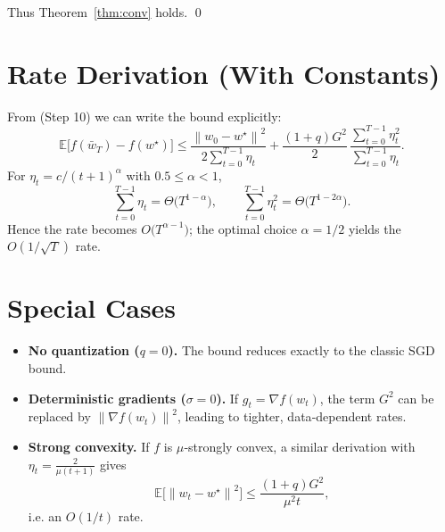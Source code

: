 \documentclass{article}
\newcommand{\E}{\mathbb{E}}
\newcommand{\norm}[1]{\left\| #1 \right\|}
\begin{document}
Thus Theorem~\ref{thm:conv} holds. \qed

\section*{Rate Derivation (With Constants)}
From (Step 10) we can write the bound explicitly:
\[
\E\!\bigl[f(\bar w_T)-f(w^\star)\bigr]
\le \frac{\norm{w_0-w^\star}^2}{2\sum_{t=0}^{T-1}\eta_t}
    +\frac{(1+q)G^{2}}{2}\,\frac{\sum_{t=0}^{T-1}\eta_t^{2}}{\sum_{t=0}^{T-1}\eta_t}.
\]
For $\eta_t=c/(t+1)^{\alpha}$ with $0.5\le\alpha<1$,
\[
\sum_{t=0}^{T-1}\eta_t = \Theta\bigl(T^{1-\alpha}\bigr),\qquad
\sum_{t=0}^{T-1}\eta_t^{2}= \Theta\bigl(T^{1-2\alpha}\bigr).
\]
Hence the rate becomes $O\!\bigl(T^{\alpha-1}\bigr)$; the optimal choice $\alpha=1/2$ yields the $O(1/\sqrt{T})$ rate.

\section*{Special Cases}
\begin{itemize}
\item \textbf{No quantization ($q=0$).} The bound reduces exactly to the classic SGD bound.
\item \textbf{Deterministic gradients ($\sigma=0$).} If $g_t=\nabla f(w_t)$, the term $G^{2}$ can be replaced by $\norm{\nabla f(w_t)}^{2}$, leading to tighter, data‑dependent rates.
\item \textbf{Strong convexity.} If $f$ is $\mu$‑strongly convex, a similar derivation with $\eta_t=\frac{2}{\mu (t+1)}$ gives
\[
\E\!\bigl[\norm{w_t-w^\star}^{2}\bigr]\le \frac{(1+q)G^{2}}{\mu^{2}t},
\]
i.e. an $O(1/t)$ rate.
\end{itemize}
\end{document}
